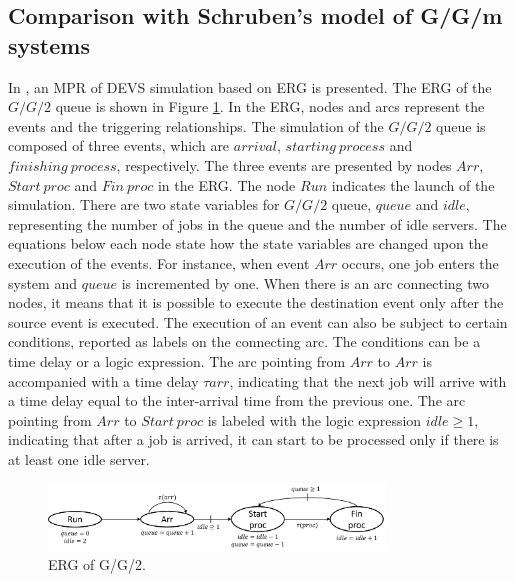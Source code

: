 \documentclass[suppldata]{interact}
\theoremstyle{plain}
\theoremstyle{definition}
\theoremstyle{remark}
\begin{document}
\subsection{Comparison with Schruben's model of G/G/m systems}
In \cite{chan2008optimization}, an MPR of DEVS simulation based on ERG is presented. The ERG of the $G/G/2$ queue is shown in Figure \ref{fig:ERG_GG2}. In the ERG, nodes and arcs represent the events and the triggering relationships. The simulation of the $G/G/2$ queue is composed of three events, which are $arrival$, $starting\ process$ and $finishing\ process$, respectively. The three events are presented by nodes $Arr$, $Start\ proc$ and $Fin\ proc$ in the ERG. The node $Run$ indicates the launch of the simulation. There are two state variables for $G/G/2$ queue, $queue$ and $idle$, representing the number of jobs in the queue and the number of idle servers. The equations below each node state how the state variables are changed upon the execution of the events. For instance, when event $Arr$ occurs, one job enters the system and $queue$ is incremented by one. When there is an arc connecting two nodes, it means that it is possible to execute the destination event only after the source event is executed. %
The execution of an event can also be subject to certain conditions, reported as labels on the connecting arc. The conditions can be a time delay or a logic expression. %
The arc pointing from $Arr$ to $Arr$ is accompanied with a time delay $\tau{arr}$, indicating that the next job will arrive with a time delay equal to the inter-arrival time from the previous one. The arc pointing from $Arr$ to $Start\ proc$ is %
labeled with the logic expression $idle\ge 1$, indicating that after a job is arrived, it can start to be processed only if there is at least one idle server.

\begin{figure}[h]
	\centering
	\includegraphics[width=0.8\textwidth]{Figures/GG2-ERG.png}
	\caption{ERG of G/G/2.}
	\label{fig:ERG_GG2}
\end{figure}
\end{document}
